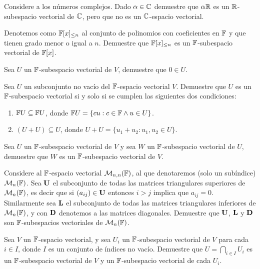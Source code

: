 \begin{exerciselist}
  \item Considere a los números complejos. Dado $\alpha \in \mathbb{C}$ demuestre que $\alpha \mathbb{R}$ es un $\mathbb{R}$-subespacio vectorial de $\mathbb{C}$, pero que no es un $\mathbb{C}$-espacio vectorial.
  
  \item \label{exer:PolyGradLeqn} Denotemos como $\mathbb{F}[x]_{\leq n}$ al conjunto de polinomios con coeficientes en $\mathbb{F}$ y que tienen grado menor o igual a $n$. Demuestre que $\mathbb{F}[x]_{\leq n}$ es un $\mathbb{F}$-subespacio vectorial de $\mathbb{F}[x]$.
  
  \item Sea $U$ un $\mathbb{F}$-subespacio vectorial de $V$, demuestre que $0 \in U$.
  
  \item Sea $U$ un subconjunto no vacío del $\mathbb{F}$-espacio vectorial $V$. Demuestre que $U$ es un $\mathbb{F}$-subespacio vectorial si y solo si se cumplen las siguientes dos condiciones:
    \begin{enumerate}
      \item $\mathbb{F} U \subseteq \mathbb{F} U$, donde $\mathbb{F} U = \{cu : c \in \mathbb{F} \land u \in U\}$.
      \item $(U + U) \subseteq U$, donde $U+U = \{u_1 + u_2 \colon u_1, u_2 \in U\}$.
    \end{enumerate}

  \item Sea $U$ un $\mathbb{F}$-subespacio vectorial de $V$ y sea $W$ un $\mathbb{F}$-subespacio vectorial de $U$, demuestre que $W$ es un $\mathbb{F}$-subespacio vectorial de $V$.
  
  \item \label{exer:MatULD} Considere al $\mathbb{F}$-espacio vectorial $\mathcal{M}_{n,n} ( \mathbb{F} )$, al que denotaremos (solo un subíndice) $\mathcal{M}_n(\mathbb{F})$. Sea $\mathbf{U}$ el subconjunto de todas las matrices triangulares superiores de $\mathcal{M}_n(\mathbb{F})$, es decir que si $(a_{ij}) \in \mathbf{U}$ entonces $i > j$ implica que $a_{ij} = 0$. Similarmente sea $\mathbf{L}$ el subconjunto de todas las matrices triangulares inferiores de $\mathcal{M}_n(\mathbb{F})$, y con $\mathbf{D}$ denotemos a las matrices diagonales. Demuestre que $\mathbf{U}$, $\mathbf{L}$ y $\mathbf{D}$ son $\mathbb{F}$-subespacios vectoriales de $\mathcal{M}_n(\mathbb{F})$.
  
  \item Sea $V$ un $\mathbb{F}$-espacio vectorial, y sea $U_i$ un $\mathbb{F}$-subespacio vectorial de $V$ para cada $i \in I$, donde $I$ es un conjunto de índices no vacío. Demuestre que $U = \bigcap_{i \in I} U_i$ es un $\mathbb{F}$-subespacio vectorial de $V$ y un $\mathbb{F}$-subespacio vectorial de cada $U_i$.
  

\end{exerciselist}

